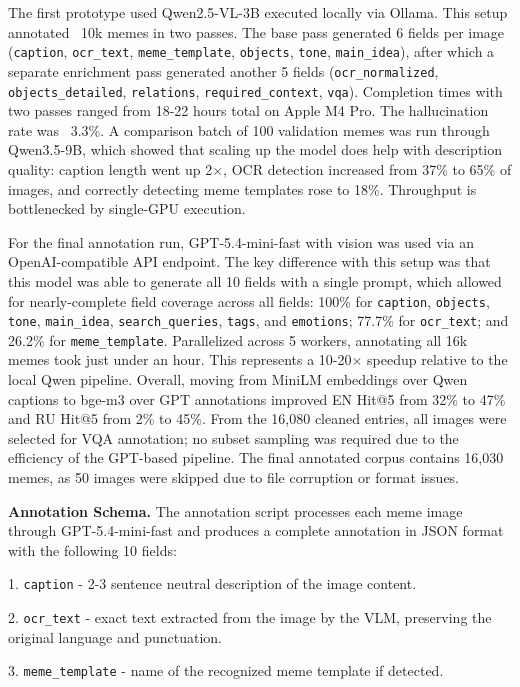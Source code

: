 \documentclass[a4paper,12pt]{article}
\begin{document}
The first prototype used Qwen2.5-VL-3B executed locally via Ollama. This setup annotated ~10k memes in two passes. The base pass generated 6 fields per image (\texttt{caption}, \texttt{ocr\_text}, \texttt{meme\_template}, \texttt{objects}, \texttt{tone}, \texttt{main\_idea}), after which a separate enrichment pass generated another 5 fields (\texttt{ocr\_normalized}, \texttt{objects\_detailed}, \texttt{relations}, \texttt{required\_context}, \texttt{vqa}). Completion times with two passes ranged from 18-22 hours total on Apple M4 Pro. The hallucination rate was ~3.3\%. A comparison batch of 100 validation memes was run through Qwen3.5-9B, which showed that scaling up the model does help with description quality: caption length went up 2$\times$, OCR detection increased from 37\% to 65\% of images, and correctly detecting meme templates rose to 18\%. Throughput is bottlenecked by single-GPU execution.

For the final annotation run, GPT-5.4-mini-fast with vision was used via an OpenAI-compatible API endpoint. The key difference with this setup was that this model was able to generate all 10 fields with a single prompt, which allowed for nearly-complete field coverage across all fields: 100\% for \texttt{caption}, \texttt{objects}, \texttt{tone}, \texttt{main\_idea}, \texttt{search\_queries}, \texttt{tags}, and \texttt{emotions}; 77.7\% for \texttt{ocr\_text}; and 26.2\% for \texttt{meme\_template}. Parallelized across 5 workers, annotating all 16k memes took just under an hour. This represents a 10-20$\times$ speedup relative to the local Qwen pipeline. Overall, moving from MiniLM embeddings over Qwen captions to bge-m3 over GPT annotations improved EN Hit@5 from 32\% to 47\% and RU Hit@5 from 2\% to 45\%. From the 16,080 cleaned entries, all images were selected for VQA annotation; no subset sampling was required due to the efficiency of the GPT-based pipeline. The final annotated corpus contains 16,030 memes, as 50 images were skipped due to file corruption or format issues.

\textbf{Annotation Schema.} The annotation script processes each meme image through GPT-5.4-mini-fast and produces a complete annotation in JSON format with the following 10 fields:

1. \texttt{caption} - 2-3 sentence neutral description of the image content.

2. \texttt{ocr\_text} - exact text extracted from the image by the VLM, preserving the original language and punctuation.

3. \texttt{meme\_template} - name of the recognized meme template if detected.
\end{document}
